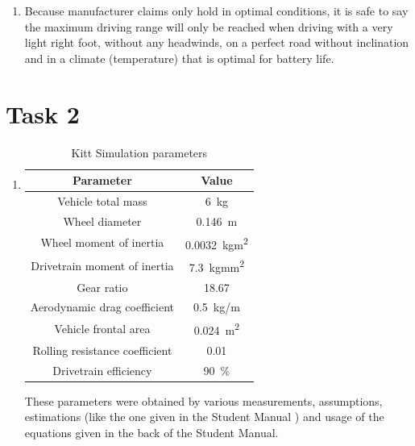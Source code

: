\documentclass[11pt,titlepage]{report}
\begin{document}
\begin{enumerate}
\item
	Because manufacturer claims only hold in optimal conditions, it is safe to say the maximum driving range will only be reached when driving with a very light right foot, without any headwinds, on a perfect road without inclination and in a climate (temperature) that is optimal for battery life.
\end{enumerate}

\section{Task 2}
\begin{enumerate}
\item
	\begin{table}[H]
		\centering
		\caption{Kitt Simulation parameters}
		\label{tab:ass4-sim-param}
		\begin{tabular}{c c}
			\hline\hline
			Parameter & Value \\
			\hline
			Vehicle total mass & \SI{6}{kg} \\
			Wheel diameter & \SI{0.146}{m} \cite{traxxas-datasheet}\\
			Wheel moment of inertia & \SI{0.0032}{kgm^2} \\
			Drivetrain moment of inertia & \SI{7.3}{kgmm^2} \\
			Gear ratio & \num{18.67} \cite{traxxas-datasheet}\\
			Aerodynamic drag coefficient & \SI{0.5}{kg/m} \\
			Vehicle frontal area & \SI{0.024}{m^2} \\
			Rolling resistance coefficient & \num{0.01} \cite{wikipedia-rolling-resistance}\\
			Drivetrain efficiency & \SI{90}{\percent} \\
			\hline
			\end{tabular}
	\end{table}
	These parameters were obtained by various measurements, assumptions, estimations (like the one given in the Student Manual \cite[32]{epo4-manual}) and usage of the equations given in the back of the Student Manual. \cite[119-131]{epo4-manual}


\end{enumerate}
\end{document}
